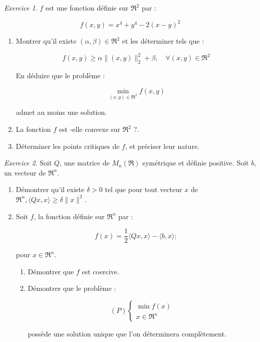 \documentclass[a4paper,12pt,openany]{book}
\theoremstyle{plain}
\theoremstyle{definition}
\theoremstyle{remark}
\newtheorem{exercise}{Exercice}[section]
\theoremstyle{nbstyle}
\begin{document}
	\begin{exercise}\label{Exo2chap1}
		$f$ est une fonction définie sur $\Re^{2}$ par :
		
		$$
		f(x, y)=x^{4}+y^{4}-2(x-y)^{2}
		$$
		
		\begin{enumerate}
			\item Montrer qu'il existe $(\alpha, \beta) \in \Re^{2}$ et les déterminer tels que :
			
			$$
			f(x, y) \geq \alpha\|(x, y)\|_{2}^{2}+\beta, \quad \forall(x, y) \in \Re^{2}
			$$
			
			En déduire que le problème :
			
			$$
			\displaystyle\min _{(x, y) \in \Re^{2}} f(x, y)
			$$
			
			admet au moins une solution.\\
			\item  La fonction $f$ est -elle convexe sur $\Re^{2}$ ?.\\
			\item Déterminer les points critiques de $f$, et préciser leur nature.\\
		\end{enumerate}
	\end{exercise}
	\begin{exercise}\label{Exo3chap1}
		Soit $Q$, une matrice de $M_{n}(\Re)$ symétrique et définie positive. Soit $b$, un vecteur de $\Re^{n}$.
		
		\begin{enumerate}
			\item Démontrer qu'il existe $\delta>0$ tel que pour tout vecteur $x$ de $\Re^{n},\langle Q x, x\rangle \geq \delta\|x\|^{2}$.
			\item Soit $f$, la fonction définie sur $\Re^{n}$ par :
	
		
		$$
		f(x)=\frac{1}{2}\langle Q x, x\rangle-\langle b, x\rangle ;
		$$
		
		pour $x \in \Re^{n}$.\\
		\begin{enumerate}
			\item Démontrer que $f$ est coercive.\\
			\item  Démontrer que le problème :
			
			$$
			(P)\left\{\begin{array}{c}
			\displaystyle\min f(x) \\
			x \in \Re^{n}
			\end{array}\right.
			$$
			
			possède une solution unique que l'on déterminera complètement.
		\end{enumerate}
		\end{enumerate}
	\end{exercise}
	
\end{document}
